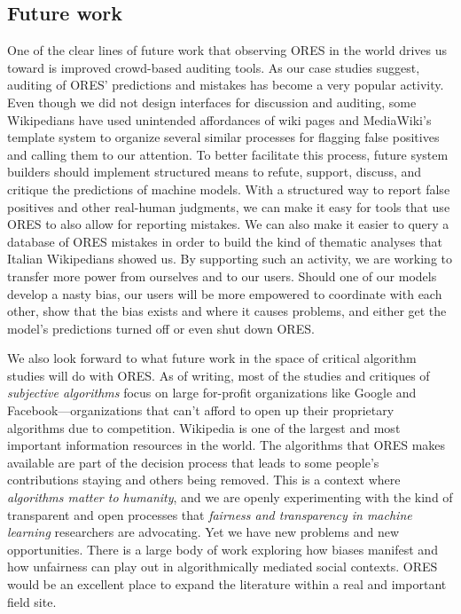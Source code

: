 \subsection{Future work}
One of the clear lines of future work that observing ORES in the world drives us toward is improved crowd-based auditing tools.  As our case studies suggest, auditing of ORES' predictions and mistakes has become a very popular activity. Even though we did not design interfaces for discussion and auditing, some Wikipedians have used unintended affordances of wiki pages and MediaWiki's template system to organize several similar processes for flagging false positives and calling them to our attention.  To better facilitate this process, future system builders should implement structured means to refute, support, discuss, and critique the predictions of machine models.  With a structured way to report false positives and other real-human judgments, we can make it easy for tools that use ORES to also allow for reporting mistakes.  We can also make it easier to query a database of ORES mistakes in order to build the kind of thematic analyses that Italian Wikipedians showed us.  By supporting such an activity, we are working to transfer more power from ourselves and to our users.  Should one of our models develop a nasty bias, our users will be more empowered to coordinate with each other, show that the bias exists and where it causes problems, and either get the model's predictions turned off or even shut down ORES.

We also look forward to what future work in the space of critical algorithm studies will do with ORES.  As of writing, most of the studies and critiques of \emph{subjective algorithms}\cite{tufekci2015algorithms} focus on large for-profit organizations like Google and Facebook---organizations that can't afford to open up their proprietary algorithms due to competition.  Wikipedia is one of the largest and most important information resources in the world.  The algorithms that ORES makes available are part of the decision process that leads to some people's contributions staying and others being removed.  This is a context where \emph{algorithms matter to humanity}, and we are openly experimenting with the kind of transparent and open processes that \emph{fairness and transparency in machine learning} researchers are advocating.  Yet we have new problems and new opportunities.  There is a large body of work exploring how biases manifest and how unfairness can play out in algorithmically mediated social contexts.  ORES would be an excellent place to expand the literature within a real and important field site.

